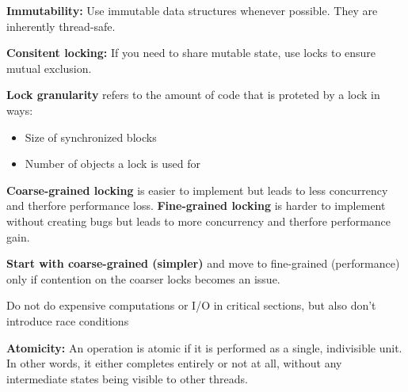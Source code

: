 \begin{important}
    \textbf{Immutability:} Use immutable data structures whenever possible. They are inherently thread-safe.
\end{important}

\begin{important}
    \textbf{Consitent locking:} If you need to share mutable state, use locks to ensure mutual exclusion.
\end{important}

\begin{definition}
    \textbf{Lock granularity } refers to the amount of code that is proteted by a lock in ways:
    \begin{itemize}
        \item Size of synchronized blocks
        \item Number of objects a lock is used for
    \end{itemize}
\end{definition}

\begin{theorem}
    \textbf{Coarse-grained locking} is easier to implement but leads to less concurrency and therfore performance loss. \textbf{Fine-grained locking} is harder to implement without creating bugs but leads to more concurrency and therfore performance gain.
\end{theorem}

\begin{important}
    \textbf{Start with coarse-grained (simpler)} and move to fine-grained (performance) only if contention on the coarser locks becomes an issue.
\end{important}

\begin{important}
    Do not do expensive computations or I/O in critical sections, but also don’t introduce race conditions
\end{important}

\begin{definition}
    \textbf{Atomicity: } An operation is atomic if it is performed as a single, indivisible unit. In other words, it either completes entirely or not at all, without any intermediate states being visible to other threads.
\end{definition}